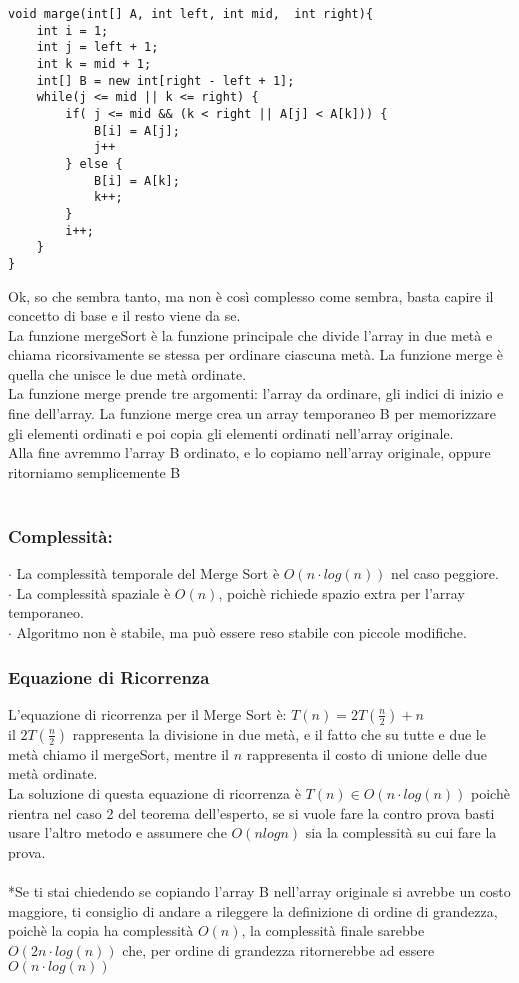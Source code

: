 \documentclass[a4paper,12pt]{article}
\begin{document}
\begin{lstlisting}[style=mystyle]
void marge(int[] A, int left, int mid,  int right){
    int i = 1;
    int j = left + 1;
    int k = mid + 1;
    int[] B = new int[right - left + 1];
    while(j <= mid || k <= right) {
        if( j <= mid && (k < right || A[j] < A[k])) {
            B[i] = A[j];
            j++
        } else {
            B[i] = A[k];
            k++;
        }
        i++;
    }
}
\end{lstlisting}
\newpage
Ok, so che sembra tanto, ma non è così complesso come sembra, basta capire il concetto di base e il resto viene da se. \\
La funzione mergeSort è la funzione principale che divide l'array in due metà e chiama ricorsivamente se stessa per ordinare ciascuna metà. La funzione merge è quella che unisce le due metà ordinate. \\
La funzione merge prende tre argomenti: l'array da ordinare, gli indici di inizio e fine dell'array. La funzione merge crea un array temporaneo B per memorizzare gli elementi ordinati e poi copia gli elementi ordinati nell'array originale. \\
Alla fine avremmo l'array B ordinato, e lo copiamo nell'array originale, oppure ritorniamo semplicemente B\\
\\
\subsubsection*{{\textcolor{teorema}{Complessità: }}}
$\cdot $ La complessità temporale del Merge Sort è $O(n \cdot log(n))$ nel caso peggiore. \\
$\cdot $ La complessità spaziale è $O(n)$, poichè richiede spazio extra per l'array temporaneo. \\
$\cdot $ Algoritmo non è stabile, ma può essere reso stabile con piccole modifiche. \\

\subsubsection{Equazione di Ricorrenza}
L'equazione di ricorrenza per il Merge Sort è: $ T(n) = 2T(\frac{n}{2}) + n $ \\
il $2T(\frac{n}{2})$ rappresenta la divisione in due metà, e il fatto che su tutte e due le metà chiamo il mergeSort, mentre il $n$ rappresenta il costo di unione delle due metà ordinate. \\
La soluzione di questa equazione di ricorrenza è $T(n) \in O(n \cdot log(n))$ poichè rientra nel caso 2 del teorema dell'esperto, se si vuole fare la contro prova basti usare l'altro metodo e assumere che $O(nlogn)$ sia la complessità su cui fare la prova.
\\
\\
*Se ti stai chiedendo se copiando l'array B nell'array originale si avrebbe un costo maggiore, ti consiglio di andare a rileggere la definizione di ordine di grandezza, poichè la copia ha complessità $O(n)$, la complessità finale sarebbe  $O(2n \cdot log(n))$ che, per ordine di grandezza ritornerebbe ad essere $O(n \cdot log(n))$ \\
\end{document}
